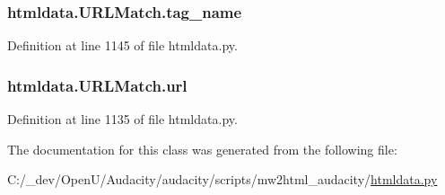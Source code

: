 \subsubsection[{\texorpdfstring{tag\+\_\+name}{tag_name}}]{\setlength{\rightskip}{0pt plus 5cm}htmldata.\+U\+R\+L\+Match.\+tag\+\_\+name}\hypertarget{classhtmldata_1_1_u_r_l_match_a29bcaf66b99584041682125ce9c84b0a}{}\label{classhtmldata_1_1_u_r_l_match_a29bcaf66b99584041682125ce9c84b0a}


Definition at line 1145 of file htmldata.\+py.

\subsubsection[{\texorpdfstring{url}{url}}]{\setlength{\rightskip}{0pt plus 5cm}htmldata.\+U\+R\+L\+Match.\+url}\hypertarget{classhtmldata_1_1_u_r_l_match_a5923f37f0b8b27fc79b2c91a2d9e919f}{}\label{classhtmldata_1_1_u_r_l_match_a5923f37f0b8b27fc79b2c91a2d9e919f}


Definition at line 1135 of file htmldata.\+py.



The documentation for this class was generated from the following file\+:\begin{DoxyCompactItemize}
\item 
C\+:/\+\_\+dev/\+Open\+U/\+Audacity/audacity/scripts/mw2html\+\_\+audacity/\hyperlink{htmldata_8py}{htmldata.\+py}\end{DoxyCompactItemize}

